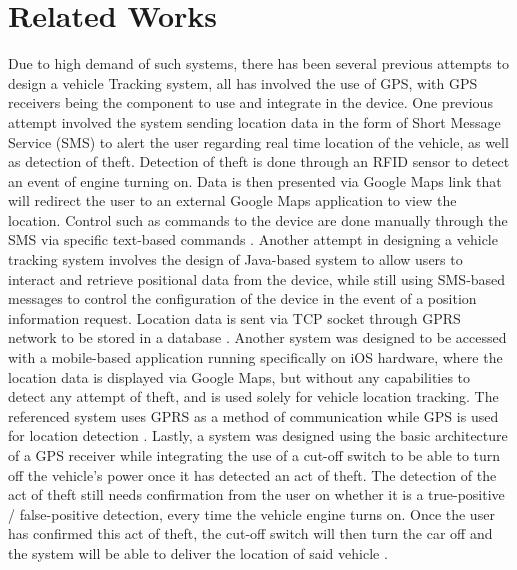 \documentclass[conference]{IEEEtran}
\begin{document}
\section{Related Works}
Due to high demand of such systems, there has been several previous attempts to design a vehicle Tracking system, all has involved the use of GPS, with GPS receivers being the component to use and integrate in the device. One previous attempt involved the system sending location data in the form of Short Message Service (SMS) to alert the user regarding real time location of the vehicle, as well as detection of theft. Detection of theft is done through an RFID sensor to detect an event of engine turning on. Data is then presented via Google Maps link that will redirect the user to an external Google Maps application to view the location. Control such as commands to the device are done manually through the SMS via specific text-based commands \cite{iotmounika}. Another attempt in designing a vehicle tracking system involves the design of Java-based system to allow users to interact and retrieve positional data from the device, while still using SMS-based messages to control the 
configuration of the device in the event of a position information request. Location data is sent via TCP socket through GPRS network to be stored in a database \cite{6132526}. Another system was designed to be accessed with a mobile-based application running specifically on iOS hardware, where the location data is displayed via Google Maps, but without any capabilities to detect any attempt of theft, and is used solely for vehicle location tracking. The referenced system uses GPRS as a method of communication while GPS is used for location detection \cite{6803187}.
Lastly, a system was designed using the basic architecture of a GPS receiver while integrating the use of a cut-off switch to be able to turn off the vehicle's power once it has detected an act of theft. The detection of the act of theft still needs confirmation from the user on whether it is a true-positive / false-positive detection, every time the vehicle engine turns on. Once the user has confirmed this act of theft, the cut-off switch will then turn the car off and the system will be able to deliver the location of said vehicle \cite{article1}. 
\end{document}
